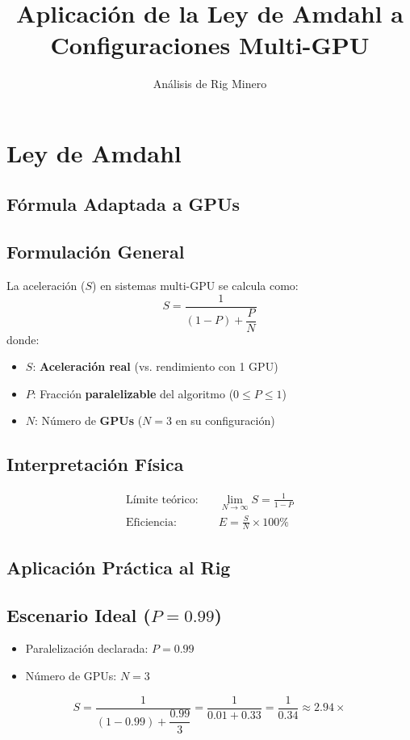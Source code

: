\documentclass{article}
\title{Aplicación de la Ley de Amdahl a Configuraciones Multi-GPU}
\author{Análisis de Rig Minero}
\date{}
\begin{document}
\maketitle

\section{Ley de Amdahl}
\subsection*{Fórmula Adaptada a GPUs}

\subsection*{Formulación General}
La aceleración (\(S\)) en sistemas multi-GPU se calcula como:
\[
\boxed{S = \dfrac{1}{(1 - P) + \dfrac{P}{N}}}
\]
donde:
\begin{itemize}
  \item \(S\): \textbf{Aceleración real} (vs. rendimiento con 1 GPU)
  \item \(P\): Fracción \textbf{paralelizable} del algoritmo (\(0 \leq P \leq 1\))
  \item \(N\): Número de \textbf{GPUs} (\(N = 3\) en su configuración)
\end{itemize}

\subsection*{Interpretación Física}
\begin{align*}
\text{Límite teórico:} \quad & \lim_{N \to \infty} S = \frac{1}{1 - P} \\
\text{Eficiencia:} \quad & E = \frac{S}{N} \times 100\%
\end{align*}

\subsection*{Aplicación Práctica al Rig}

\subsection*{Escenario Ideal (\(P = 0.99\))}
\begin{itemize}
  \item Paralelización declarada: \(P = 0.99\)
  \item Número de GPUs: \(N = 3\)
\end{itemize}
\[
S = \dfrac{1}{(1 - 0.99) + \dfrac{0.99}{3}} = \dfrac{1}{0.01 + 0.33} = \dfrac{1}{0.34} \approx 2.94\times
\]
\end{document}

